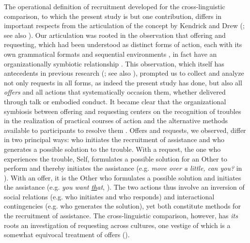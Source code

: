 \documentclass[output=paper,nonflat,modfont,draft]{langsci/langscibook}
\begin{document}
The operational definition of recruitment developed for the cross-linguistic comparison, to which the present study is but one contribution, differs in important respects from the articulation of the concept by Kendrick and Drew (\citeyear{KendrickDrew2016}; see also \citealt{DrewKendrick2017}). Our articulation was rooted in the observation that offering and requesting, which had been understood as distinct forms of action, each with its own grammatical formats and sequential environments \citep[see, e.g.,][]{Curl2006, curlcontingency2008}, in fact have an organizationally symbiotic relationship \citep{KendrickDrew2014}. This observation, which itself has antecedents in previous research (\citealt{Schegloff1995}; see also \citealt{Heritage2016}), prompted us to collect and analyze not only requests in all forms, as indeed the present study has done, but also all \textit{offers} and all actions that systematically occasion them, whether delivered through talk or embodied conduct. It became clear that the organizational symbiosis between offering and requesting centers on the recognition of troubles in the realization of practical courses of action and the alternative methods available to participants to resolve them \citep{KendrickDrew2016}. Offers and requests, we observed, differ in two principal ways: who initiates the recruitment of assistance and who generates a possible solution to the trouble. With a request, the one who experiences the trouble, Self, formulates a possible solution for an Other to perform and thereby initiates the assistance (e.g. \textit{move over a little, can you?} in ). With an offer, it is the Other who formulates a possible solution and initiates the assistance (e.g. \textit{you want \uline{th}at}, \citealt[7]{KendrickDrew2016}). The two actions thus involve an inversion of social relations (e.g. who initiates and who responds) and interactional contingencies (e.g. who generates the solution), yet both constitute methods for the recruitment of assistance. The cross-linguistic comparison, however, has \textit{its} roots an investigation of requesting across cultures, one vestige of which is a somewhat equivocal treatment of offers ().
\end{document}

